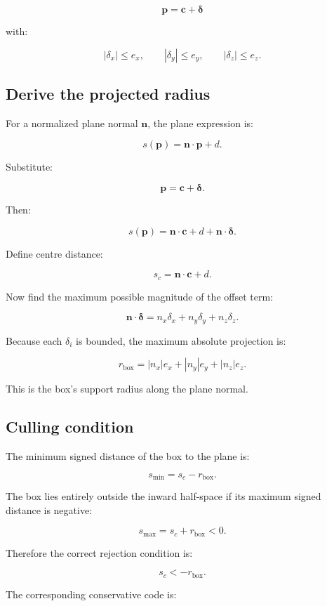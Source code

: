 \[
 \mathbf p=\mathbf c+\boldsymbol\delta
\]

with:

\[
 |\delta_x|\le e_x, \qquad |\delta_y|\le e_y, \qquad |\delta_z|\le e_z.
\]

\subsection{Derive the projected radius}\label{02-foundations-ii-ch034-derive-the-projected-radius}

For a normalized plane normal \(\mathbf n\), the plane expression is:

\[
 s(\mathbf p)=\mathbf n\cdot\mathbf p+d.
\]

Substitute:

\[
 \mathbf p=\mathbf c+\boldsymbol\delta.
\]

Then:

\[
 s(\mathbf p)= \mathbf n\cdot\mathbf c+d+ \mathbf n\cdot\boldsymbol\delta.
\]

Define centre distance:

\[
 \boxed{ s_c=\mathbf n\cdot\mathbf c+d }.
\]

Now find the maximum possible magnitude of the offset term:

\[
 \mathbf n\cdot\boldsymbol\delta = n_x\delta_x+n_y\delta_y+n_z\delta_z.
\]

Because each \(\delta_i\) is bounded, the maximum absolute projection is:

\[
 \boxed{ r_{\mathrm{box}}= |n_x|e_x+|n_y|e_y+|n_z|e_z }.
\]

This is the box's support radius along the plane normal.

\subsection{Culling condition}\label{02-foundations-ii-ch034-culling-condition}

The minimum signed distance of the box to the plane is:

\[
 s_{\min}=s_c-r_{\mathrm{box}}.
\]

The box lies entirely outside the inward half-space if its maximum signed distance is negative:

\[
 s_{\max}=s_c+r_{\mathrm{box}}<0.
\]

Therefore the correct rejection condition is:

\[
 \boxed{ s_c<-r_{\mathrm{box}} }.
\]

The corresponding conservative code is:

